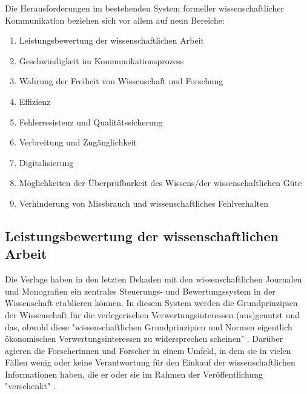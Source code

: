 Die Herausforderungen im bestehenden System formeller wissenschaftlicher Kommunikation beziehen sich vor allem auf neun Bereiche:
\begin{enumerate}
\item Leistungsbewertung der wissenschaftlichen Arbeit
\item Geschwindigkeit im Kommunikationsprozess
\item Wahrung der Freiheit von Wissenschaft und Forschung
\item Effizienz
\item Fehlerresistenz und Qualitätssicherung
\item Verbreitung und Zugänglichkeit
\item Digitalisierung
\item Möglichkeiten der Überprüfbarkeit des Wissens/der wissenschaftlichen Güte
\item Verhinderung von Missbrauch und wissenschaftliches Fehlverhalten
\end{enumerate}

\subsection{Leistungsbewertung der wissenschaftlichen Arbeit}

Die Verlage haben in den letzten Dekaden mit den wissenschaftlichen Journalen und Monografien ein zentrales Steuerungs- und Bewertungssystem in der Wissenschaft etablieren können. In diesem System werden die Grundprinzipien der Wissenschaft für die verlegerischen Verwertungsinteressen (aus)genutzt und das, obwohl diese "wissenschaftlichen Grundprinzipien und Normen eigentlich ökonomischen Verwertungsinteressen zu widersprechen scheinen" \cite{Hanekop_2006}. Darüber agieren die Forscherinnen und Forscher in einem Umfeld, in dem sie in vielen Fällen wenig oder keine Verantwortung für den Einkauf der wissenschaftlichen Informationen haben, die er oder sie im Rahmen der Veröffentlichung "verschenkt" \cite{Steele_2006}.

